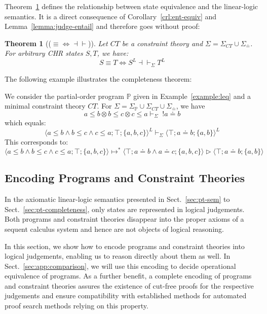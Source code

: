 \documentclass[acmtocl]{acmtrans2m}
\newtheorem{theorem}{Theorem}[section]
\newcommand\state[1]{\langle #1 \rangle}
\newcommand\ent{\rhd}
\newcommand{\bbP}{\ensuremath{\mathbb{P}}}
\newcommand{\Sct}{\ensuremath{\Sigma_{CT}}}
\newcommand{\Seq}{\ensuremath{\Sigma_{\doteq}}}
\newcommand{\Sp}{\ensuremath{\Sigma_\mathbb{P}}}
\newcommand{\bang}{\; !}
\begin{document}
Theorem~\ref{thm:equiv-ll} defines the relationship between state equivalence
and the linear-logic semantics. It is a direct consequence of
Corollary~\ref{crl:ent-equiv} and
Lemma~\ref{lemma:judge-entail} and therefore goes without proof:

\begin{theorem}[($\equiv\Leftrightarrow\dashv\vdash$)]
\label{thm:equiv-ll}
Let $CT$ be a constraint theory and $\Sigma=\Sct\cup\Seq$.
For arbitrary CHR states $S,T$, we have:
\[
S\equiv T \Leftrightarrow S^L\dashv\vdash_\Sigma T^L
\]
\end{theorem}

The following example illustrates the completeness theorem:

\begin{example}
We consider the partial-order program $\bbP$ given in Example~\ref{example:leq} and a minimal
constraint
theory $CT$. For $\Sigma=\Sp\cup\Sct\cup\Seq$, we have
\[
a\leq b\otimes b\leq c\otimes c\leq a\vdash_\Sigma \bang a\doteq b
\]
which equals:
\[
\state{a\leq b \wedge b\leq c \wedge c\leq a;\top;\{a,b,c\}}^L\vdash_\Sigma
\state{\top;a\doteq b;\{a,b\}}^L
\]
This corresponds to:
\[
\state{a\leq b \wedge b\leq c \wedge c\leq a;\top;\{a,b,c\}}
\mapsto^*
\state{\top;a\doteq b \wedge a\doteq c;\{a,b,c\}}
\ent
\state{\top;a\doteq b;\{a,b\}}
\]
\end{example}

\subsection{Encoding Programs and Constraint Theories}
\label{sec:enc-sem}

In the axiomatic linear-logic semantics presented in Sect.~\ref{sec:pt-sem} to
Sect.~\ref{sec:pt-completeness}, only states are represented in logical
judgements. Both programs and constraint theories disappear into the proper
axioms of a sequent calculus system and hence are not objects of logical
reasoning.

In this section, we show how to encode programs and constraint theories into
logical judgements, enabling us to reason directly about them as well. In
Sect.~\ref{sec:app:comparison}, we will use this encoding to decide operational
equivalence of programs. As a further benefit, a complete encoding of programs
and constraint theories assures the existence of cut-free proofs for the
respective judgements and ensure compatibility with established methods for
automated proof search methods relying on this property.
\end{document}
